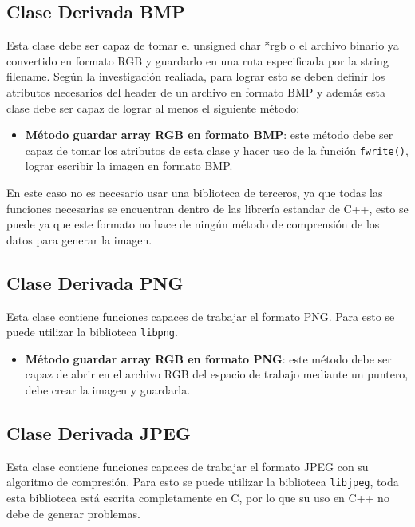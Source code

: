 \subsection{Clase Derivada BMP} 

Esta clase debe ser capaz de tomar el unsigned char *rgb o el archivo binario ya convertido en formato RGB y guardarlo en una ruta especificada por la string filename. Según la investigación realiada, para lograr esto se deben definir los atributos necesarios del header de un archivo en formato BMP y además esta clase debe ser capaz de lograr al menos el siguiente método:
 
\begin{itemize}
    \item \textbf{Método guardar array RGB en formato BMP}: este método debe ser capaz de tomar los atributos de esta clase y hacer uso de la función \texttt{fwrite()}, lograr escribir la imagen en formato BMP.
\end{itemize}

En este caso no es necesario usar una biblioteca de terceros, ya que todas las funciones necesarias se encuentran dentro de las librería estandar de C++, esto se puede ya que este formato no hace de ningún método de comprensión de los datos para generar la imagen. 

\subsection{Clase Derivada PNG}

Esta clase contiene funciones capaces de trabajar el formato PNG. Para esto se puede utilizar la biblioteca \texttt{libpng}.

\begin{itemize}
    \item \textbf{Método guardar array RGB en formato PNG}: este método debe ser capaz de abrir en el archivo RGB del espacio de trabajo mediante un puntero, debe crear la imagen y guardarla.
\end{itemize}


\subsection{Clase Derivada JPEG}
Esta clase contiene funciones capaces de trabajar el formato JPEG con su algoritmo de compresión. Para esto se puede utilizar la biblioteca \texttt{libjpeg}, toda esta biblioteca está escrita completamente en C, por lo que su uso en C++ no debe de generar problemas.


